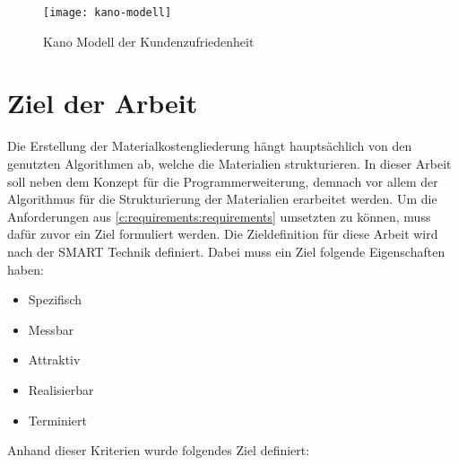 \begin{figure}[h]
	\centering
	\texttt{[image: kano-modell]}
	\caption[Kano Modells]{Kano Modell der Kundenzufriedenheit}
	\label{fig:kano-model}
\end{figure}

\section{Ziel der Arbeit}
\label{c:intro:target}
Die Erstellung der Materialkostengliederung hängt hauptsächlich von den genutzten Algorithmen ab, welche die Materialien strukturieren. In dieser Arbeit soll neben dem Konzept für die Programmerweiterung, demnach vor allem der Algorithmus für die Strukturierung der Materialien erarbeitet werden. 
Um die Anforderungen aus \autoref{c:requirements:requirements} umsetzten zu können, muss dafür zuvor ein Ziel formuliert werden. Die Zieldefinition für diese Arbeit wird nach der SMART Technik definiert. Dabei muss ein Ziel folgende Eigenschaften haben:

\begin{itemize}
	\setlength\itemsep{0.01em}
	\item Spezifisch
	\item Messbar
	\item Attraktiv
	\item Realisierbar
	\item Terminiert
\end{itemize}

Anhand dieser Kriterien wurde folgendes Ziel definiert:



